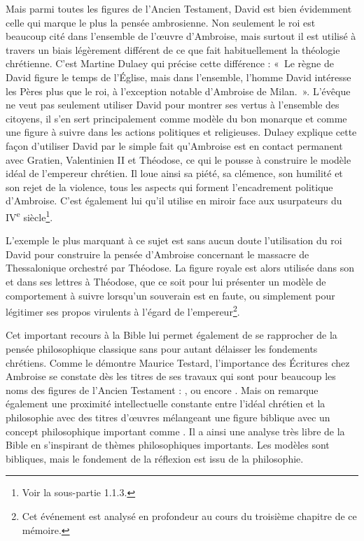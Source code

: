 \bigskip

Mais parmi toutes les figures de l'Ancien Testament, David est bien évidemment celle qui marque le plus la pensée ambrosienne. Non seulement le roi est beaucoup cité dans l'ensemble de l'œuvre d'Ambroise, mais surtout il est utilisé à travers un biais légèrement différent de ce que fait habituellement la théologie chrétienne. C'est Martine Dulaey qui précise cette différence : «~Le règne de David figure le temps de l’Église, mais dans l’ensemble, l’homme David intéresse les Pères plus que le roi, à l’exception notable d’Ambroise de Milan.\autocite{dulaey_david_3}~». L'évêque ne veut pas seulement utiliser David pour montrer ses vertus à l'ensemble des citoyens, il s'en sert principalement comme modèle du bon monarque et comme une figure à suivre dans les actions politiques et religieuses. Dulaey explique cette façon d'utiliser David par le simple fait qu'Ambroise est en contact permanent avec Gratien, Valentinien II et Théodose, ce qui le pousse à construire le modèle idéal de l'empereur chrétien. Il loue ainsi sa piété, sa clémence, son humilité et son rejet de la violence, tous les aspects qui forment l'encadrement politique d'Ambroise. C'est également lui qu'il utilise en miroir face aux usurpateurs du IV\textsuperscript{e} siècle\footnote{Voir la sous-partie 1.1.3.}.

\bigskip

L'exemple le plus marquant à ce sujet est sans aucun doute l'utilisation du roi David pour construire la pensée d'Ambroise concernant le massacre de Thessalonique orchestré par Théodose. La figure royale est alors utilisée dans son  et dans ses lettres à Théodose, que ce soit pour lui présenter un modèle de comportement à suivre lorsqu'un souverain est en faute, ou simplement pour légitimer ses propos virulents à l'égard de l'empereur\footnote{Cet événement est analysé en profondeur au cours du troisième chapitre de ce mémoire.}.

\bigskip

Cet important recours à la Bible lui permet également de se rapprocher de la pensée philosophique classique sans pour autant délaisser les fondements chrétiens. Comme le démontre Maurice Testard, l'importance des Écritures chez Ambroise se constate dès les titres de ses travaux qui sont pour beaucoup les noms des figures de l'Ancien Testament : ,  ou encore . Mais on remarque également une proximité intellectuelle constante entre l'idéal chrétien et la philosophie avec des titres d'œuvres mélangeant une figure biblique avec un concept philosophique important comme . Il a ainsi une analyse très libre de la Bible en s'inspirant de thèmes philosophiques importants. Les modèles sont bibliques, mais le fondement de la réflexion est issu de la philosophie\autocite[375]{testard_ambroise_1992}.

